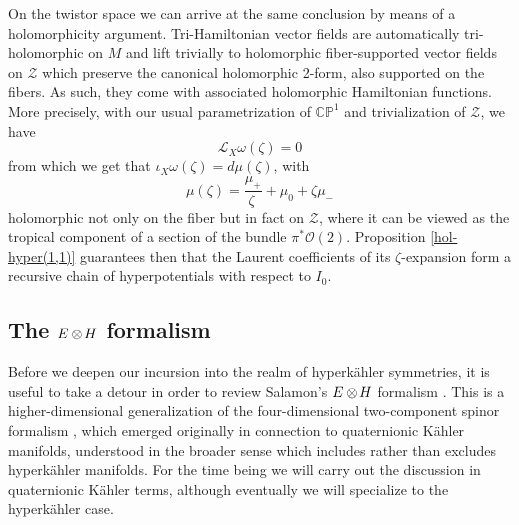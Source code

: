 \documentclass[11pt]{amsart}
\theoremstyle{remark}
\theoremstyle{remark}
\theoremstyle{definition}
\theoremstyle{definition}
\theoremstyle{definition}
\newcommand{\0}{{\scriptstyle 0'}} %
\newcommand{\1}{{\scriptstyle 1'}}
\newcommand{\hp}{\hspace{0.5pt}} %
\newcommand{\npt}{\hspace{-1pt}} %
\begin{document}
On the twistor space we can arrive at the same conclusion by means of a holomorphicity argument. Tri-Hamiltonian vector fields are automatically tri-holomorphic on $M$ and lift trivially to holomorphic fiber-supported vector fields on $\mathcal{Z}$ which preserve the canonical holomorphic 2-form, also supported on the fibers. As such, they come with associated holomorphic Hamiltonian functions. More precisely, with our usual parametrization of $\mathbb{CP}^1$ and trivialization of $\mathcal{Z}$, we have
\begin{equation} \label{Ham-zeta}
\mathcal{L}_X \omega(\zeta) = 0
\end{equation}
from which we get that $\iota_X \omega(\zeta) = d\mu(\zeta)$, with
\begin{equation}
\mu(\zeta) = \frac{\mu_+}{\zeta \ } + \mu_0 + \zeta \mu_-
\end{equation}
holomorphic not only on the fiber but in fact on $\mathcal{Z}$, where it can be viewed as the tropical component of a section of the bundle $\pi^*\mathcal{O}(2)$. Proposition \ref{hol-hyper(1,1)} guarantees then that the Laurent coefficients of its \mbox{$\zeta${\hp-\hp}expansion} form a recursive chain of hyperpotentials with respect to $I_0$. 


\subsection{The \mbox{$E \otimes\npt H$} formalism} \label{ssec:EH} \hfill \medskip


Before we deepen our incursion into the realm of hyperk\"ahler symmetries, it is useful to take a detour in order to review Salamon's \mbox{$E \otimes\npt H$} formalism \cite{MR664330}. This is a higher-dimensional generalization of the four-dimensional two-component spinor formalism \cite{MR776784}, which emerged originally in connection to quaternionic K\"ahler manifolds, understood in the broader sense which includes rather than excludes hyperk\"ahler manifolds. For the time being we will carry out the discussion in quaternionic K\"ahler terms, although eventually we will specialize to the hyperk\"ahler case. 
\end{document}
